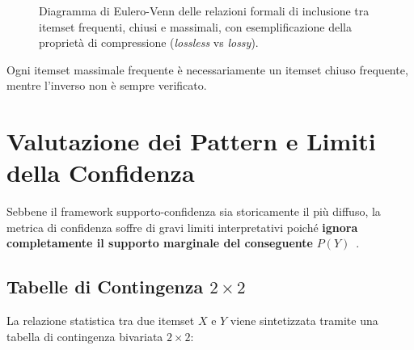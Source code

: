 \begin{figure}[H]
{%
}
\caption{Diagramma di Eulero-Venn delle relazioni formali di inclusione tra itemset frequenti, chiusi e massimali, con esemplificazione della proprietà di compressione (\textit{lossless} vs \textit{lossy}).}
\label{fig:dm-venn-itemsets}
\end{figure}

Ogni itemset massimale frequente è necessariamente un itemset chiuso frequente, mentre l'inverso non è sempre verificato.

\FloatBarrier
\section{Valutazione dei Pattern e Limiti della Confidenza}
\label{sec:dm-pattern-evaluation-confidence-limits}

Sebbene il framework supporto-confidenza sia storicamente il più diffuso, la metrica di confidenza soffre di gravi limiti interpretativi poiché \textbf{ignora completamente il supporto marginale del conseguente} $P(Y)$~\cite{tan2018}.

\FloatBarrier
\subsection{Tabelle di Contingenza $2 \times 2$}
La relazione statistica tra due itemset $X$ e $Y$ viene sintetizzata tramite una tabella di contingenza bivariata $2 \times 2$:

\begin{table}[H]
\centering
\small
\renewcommand{\arraystretch}{1.2}
\caption{Tabella di contingenza $2 \times 2$ per l'analisi di associazione congiunta.}
\label{tab:dm-contingency-2x2}
\end{table}

